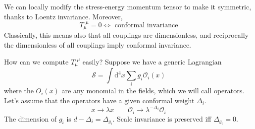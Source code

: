 \documentclass[a4paper]{book}
\theoremstyle{definition}
\theoremstyle{remark}
\begin{document}
We can locally modify the stress-energy momentum tensor to make it symmetric, thanks to Loentz invariance. Moreover, 
\begin{equation}
    T_\mu^{~~\mu} = 0 \Leftrightarrow \text{ conformal invariance}
\end{equation}
Classically, this means also that all couplings are dimensionless, and reciprocally the dimensionless of all couplings imply conformal invariance. \par \medskip 

How can we compute $T_\mu^{~~\mu}$ easily? Suppose we have a generic Lagrangian 
\begin{equation}
    \mathcal S = \int \text{d}^4 x \sum_i g_i \mathcal O_i (x)
\end{equation}
where the $O_i (x)$ are any monomial in the fields, which we will call operators. Let's assume that the operators have a given conformal weight $\Delta_i$. 
\begin{equation}
    x\rightarrow \lambda x \qquad \mathcal O_i \rightarrow \lambda^{-\Delta_i} \mathcal{O}_i
\end{equation}
The dimension of $g_i$ is $d-\Delta_i = \Delta_{g_i}$. Scale invariance is preserved iff $\Delta_{g_i} = 0$. \par \medskip 
\end{document}
